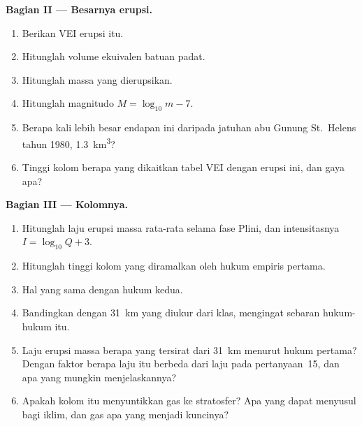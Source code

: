 \begin{problem}
\noindent\textbf{Bagian II --- Besarnya erupsi.}
\begin{enumerate}[resume]
\item Berikan VEI erupsi itu.
\item Hitunglah volume ekuivalen batuan padat.
\item Hitunglah massa yang dierupsikan.
\item Hitunglah magnitudo $M = \log_{10}m - 7$.
\item Berapa kali lebih besar endapan ini daripada jatuhan abu Gunung St.~Helens tahun 1980,
\qty{1.3}{km^3}?
\item Tinggi kolom berapa yang dikaitkan tabel VEI dengan erupsi ini, dan
gaya apa?
\end{enumerate}

\noindent\textbf{Bagian III --- Kolomnya.}
\begin{enumerate}[resume]
\item Hitunglah laju erupsi massa rata-rata selama fase Plini, dan
intensitasnya $I = \log_{10}Q + 3$.
\item Hitunglah tinggi kolom yang diramalkan oleh hukum empiris pertama.
\item Hal yang sama dengan hukum kedua.
\item Bandingkan dengan \qty{31}{km} yang diukur dari klas, mengingat sebaran
hukum-hukum itu.
\item Laju erupsi massa berapa yang tersirat dari \qty{31}{km} menurut hukum pertama? Dengan
faktor berapa laju itu berbeda dari laju pada pertanyaan~15, dan apa yang mungkin menjelaskannya?
\item Apakah kolom itu menyuntikkan gas ke stratosfer? Apa yang dapat menyusul bagi
iklim, dan gas apa yang menjadi kuncinya?
\end{enumerate}


\end{problem}
